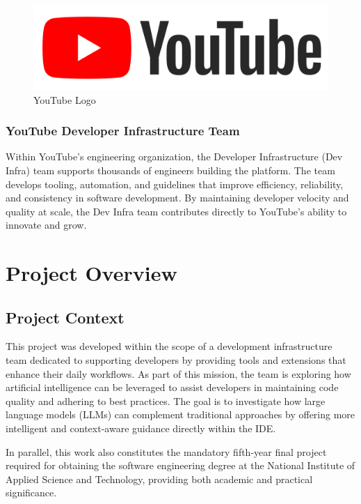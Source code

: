 \begin{spacing}{1.2}
\begin{figure}[!ht]\centering
\includegraphics[scale=0.06]{Images/youtube_logo.png}
\caption{YouTube Logo}
\label{fig:youtube_logo}
\end{figure}

\subsubsection{YouTube Developer Infrastructure Team}
Within YouTube’s engineering organization, the Developer Infrastructure (Dev Infra) team supports thousands of engineers building the platform. The team develops tooling, automation, and guidelines that improve efficiency, reliability, and consistency in software development. By maintaining developer velocity and quality at scale, the Dev Infra team contributes directly to YouTube’s ability to innovate and grow.




\section{Project Overview}

\subsection{Project Context}
This project was developed within the scope of a development infrastructure team dedicated to supporting developers by providing tools and extensions that enhance their daily workflows. As part of this mission, the team is exploring how artificial intelligence can be leveraged to assist developers in maintaining code quality and adhering to best practices. The goal is to investigate how large language models (LLMs) can complement traditional approaches by offering more intelligent and context-aware guidance directly within the IDE.  

In parallel, this work also constitutes the mandatory fifth-year final project required for obtaining the software engineering degree at the National Institute of Applied Science and Technology, providing both academic and practical significance.  


\end{spacing}

